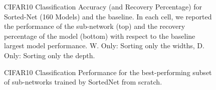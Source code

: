 \documentclass[letterpaper]{article} %
\begin{document}


\begin{figure}
\hspace*{-1cm}
\centering
\resizebox{1.1\columnwidth}{!}{  
}
\caption{CIFAR10 Classification Accuracy (and Recovery Percentage) for Sorted-Net (160 Models) and the baseline. In each cell, we reported the performance of the sub-network (top) and the recovery percentage of the model (bottom) with respect to the baseline largest model performance. W. Only: Sorting only the widths, D. Only: Sorting only the depth.}
\label{fig:scalable160}
\end{figure}

\begin{figure}
\centering
\resizebox{\columnwidth}{!}{  

}
\caption{CIFAR10 Classification Performance for the best-performing subset of sub-networks trained by SortedNet from scratch.}
\label{fig:bestsubset}
\end{figure}

\begin{table*}[htb!]
\centering
{}
\caption{Comparing the performance of state-of-
the-art methods with Sorted-Net over CIFAR10 in terms of test accuracies.}
\label{tab:CIFAR10-lcs}
\end{table*}
\end{document}
